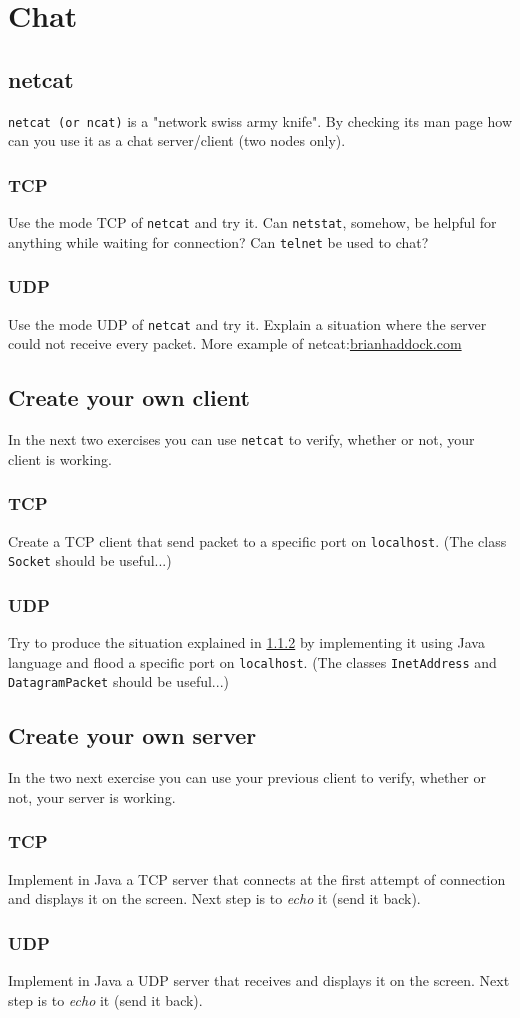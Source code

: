 \documentclass[11pt]{article}
\begin{document}
\section{Chat}
\subsection{netcat}
\verb"netcat (or ncat)" is a "network swiss army knife". By checking its man page how can you use it as a chat server/client (two nodes only).
\subsubsection{TCP}
Use the mode TCP of \verb"netcat" and try it. Can \verb"netstat", somehow, be helpful for anything while waiting for connection? Can \verb"telnet" be used to chat?
\subsubsection{UDP}\label{chat:udp}
Use the mode UDP of \verb"netcat" and try it. Explain a situation where the server could not receive every packet.
\newline
More example of netcat:\color{blue}\href{http://www.brianhaddock.com/2013/8-great-netcat-nc-unix-commands}{brianhaddock.com}\color{black}

\subsection{Create your own client}
In the next two exercises you can use \verb"netcat" to verify, whether or not, your client is working.
\subsubsection{TCP}
Create a TCP client that send packet to a specific port on \verb"localhost". (The class \verb"Socket" should be useful...)
\subsubsection{UDP}
Try to produce the situation explained in \ref{chat:udp} by implementing it using Java language and flood a specific port on \verb"localhost". (The classes \verb"InetAddress" and \verb"DatagramPacket" should be useful...)

\subsection{Create your own server}
In the two next exercise you can use your previous client to verify, whether or not, your server is working.
\subsubsection{TCP}
Implement in Java a TCP server that connects at the first attempt of connection and displays it on the screen. Next step is to \emph{echo} it (send it back).
\subsubsection{UDP}
Implement in Java a UDP server that receives and displays it on the screen. Next step is to \emph{echo} it (send it back).
\end{document}
